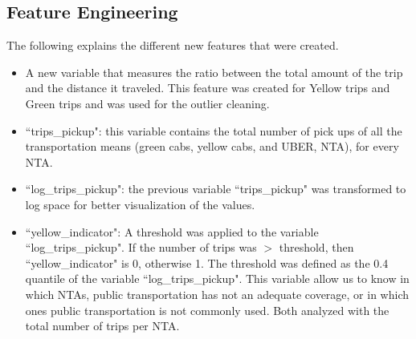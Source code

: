 \subsection{Feature Engineering}
\label{subsubsec:featureEng}

The following explains the different new features that were created.

\begin{itemize}
\item A new variable that measures the ratio between the total amount of the trip and the distance it traveled. This feature was created for Yellow trips and Green trips and was used for the outlier cleaning.

\item ``trips\_pickup": this variable contains the total number of pick ups of all the transportation means (green cabs, yellow cabs, and UBER, NTA), for every NTA. 

\item ``log\_trips\_pickup": the previous variable ``trips\_pickup" was transformed to log space for better visualization of the values.

\item ``yellow\_indicator": A threshold was applied to the variable ``log\_trips\_pickup". If the number of trips was $>$ threshold, then ``yellow\_indicator" is 0, otherwise 1. The threshold was defined as the 0.4 quantile of the variable ``log\_trips\_pickup".  This variable allow us to know in which NTAs, public transportation has not an adequate coverage, or in which ones public transportation is not commonly used. Both analyzed with the total number of trips per NTA. 

\end{itemize}
